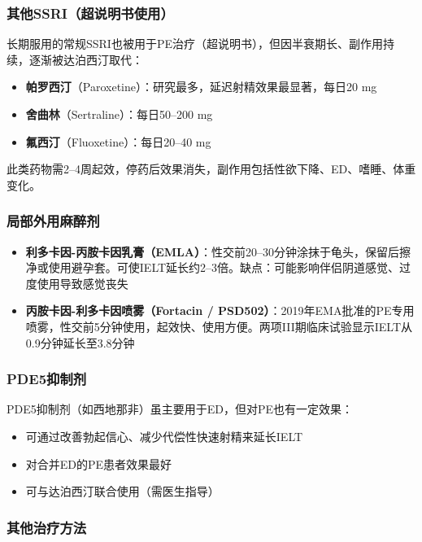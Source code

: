 \documentclass[12pt,a4paper,twoside]{ctexbook}
\begin{document}
\subsubsection{其他SSRI（超说明书使用）}

长期服用的常规SSRI也被用于PE治疗（超说明书），但因半衰期长、副作用持续，逐渐被达泊西汀取代：
\begin{itemize}[leftmargin=2cm]
	\item \textbf{帕罗西汀}（Paroxetine）：研究最多，延迟射精效果最显著，每日20 mg
	\item \textbf{舍曲林}（Sertraline）：每日50--200 mg
	\item \textbf{氟西汀}（Fluoxetine）：每日20--40 mg
\end{itemize}
此类药物需2--4周起效，停药后效果消失，副作用包括性欲下降、ED、嗜睡、体重变化。

\subsubsection{局部外用麻醉剂}

\begin{itemize}[leftmargin=2cm]
	\item \textbf{利多卡因-丙胺卡因乳膏（EMLA）}：性交前20--30分钟涂抹于龟头，保留后擦净或使用避孕套。可使IELT延长约2--3倍。缺点：可能影响伴侣阴道感觉、过度使用导致感觉丧失
	\item \textbf{丙胺卡因-利多卡因喷雾（Fortacin / PSD502）}：2019年EMA批准的PE专用喷雾，性交前5分钟使用，起效快、使用方便。两项III期临床试验显示IELT从0.9分钟延长至3.8分钟
\end{itemize}

\subsubsection{PDE5抑制剂}

PDE5抑制剂（如西地那非）虽主要用于ED，但对PE也有一定效果：
\begin{itemize}[leftmargin=2cm]
	\item 可通过改善勃起信心、减少代偿性快速射精来延长IELT
	\item 对合并ED的PE患者效果最好
	\item 可与达泊西汀联合使用（需医生指导）
\end{itemize}

\subsubsection{其他治疗方法}
\end{document}

